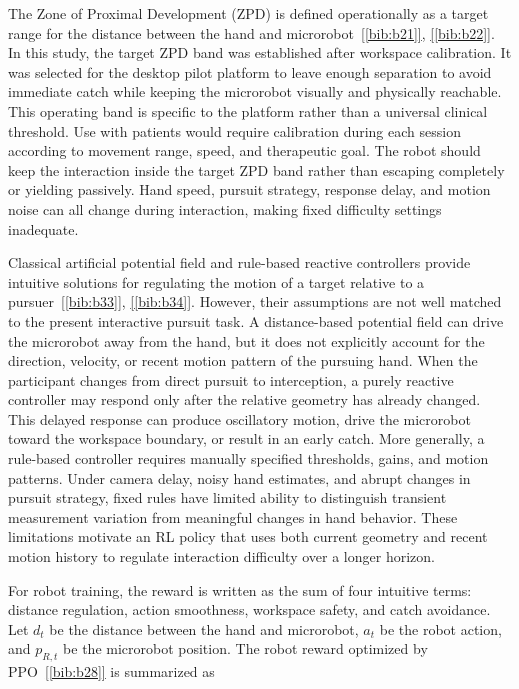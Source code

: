 \documentclass[journal,twoside,web]{ieeecolor2}
\newcommand{\citelink}[1]{\hyperref[bib:#1]{[\ref*{bib:#1}]}}
\begin{document}
The Zone of Proximal Development (ZPD) is defined operationally as a target range for the distance between the hand and microrobot~\citelink{b21}, \citelink{b22}. In this study, the target ZPD band was established after workspace calibration. It was selected for the desktop pilot platform to leave enough separation to avoid immediate catch while keeping the microrobot visually and physically reachable. This operating band is specific to the platform rather than a universal clinical threshold. Use with patients would require calibration during each session according to movement range, speed, and therapeutic goal. The robot should keep the interaction inside the target ZPD band rather than escaping completely or yielding passively. Hand speed, pursuit strategy, response delay, and motion noise can all change during interaction, making fixed difficulty settings inadequate.

Classical artificial potential field and rule-based reactive controllers provide intuitive solutions for regulating the motion of a target relative to a pursuer~\citelink{b33}, \citelink{b34}. However, their assumptions are not well matched to the present interactive pursuit task. A distance-based potential field can drive the microrobot away from the hand, but it does not explicitly account for the direction, velocity, or recent motion pattern of the pursuing hand. When the participant changes from direct pursuit to interception, a purely reactive controller may respond only after the relative geometry has already changed. This delayed response can produce oscillatory motion, drive the microrobot toward the workspace boundary, or result in an early catch. More generally, a rule-based controller requires manually specified thresholds, gains, and motion patterns. Under camera delay, noisy hand estimates, and abrupt changes in pursuit strategy, fixed rules have limited ability to distinguish transient measurement variation from meaningful changes in hand behavior. These limitations motivate an RL policy that uses both current geometry and recent motion history to regulate interaction difficulty over a longer horizon.

For robot training, the reward is written as the sum of four intuitive terms: distance regulation, action smoothness, workspace safety, and catch avoidance. Let $d_t$ be the distance between the hand and microrobot, $a_t$ be the robot action, and $p_{R,t}$ be the microrobot position. The robot reward optimized by PPO~\citelink{b28} is summarized as
\end{document}
